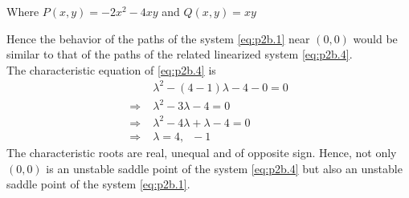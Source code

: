 \documentclass[../main-sheet.tex]{subfiles}
\begin{document}
\begin{soln}[b]
\begin{enumerate}[label=(\roman*)]
        Where \(P(x,y)=-2x^2-4xy\) and \(Q(x,y)=xy\)
    \end{enumerate}
    Hence the behavior of the paths of the system \eqref{eq:p2b.1} near \((0,0)\) would be similar to that of the paths of the related linearized system \eqref{eq:p2b.4}.\\
    The characteristic equation of \eqref{eq:p2b.4} is
    \begin{align*}
        &\lambda^2-(4-1)\lambda-4-0=0\\
        \Rightarrow\;&\lambda^2-3\lambda-4=0\\
        \Rightarrow\;&\lambda^2-4\lambda+\lambda-4=0\\
        \Rightarrow\;&\lambda=4,\;\;-1
    \end{align*}
    The characteristic roots are real, unequal and of opposite sign. Hence, not only \((0,0)\) is an unstable saddle point of the system \eqref{eq:p2b.4} but also an unstable saddle point of the system \eqref{eq:p2b.1}.\\
    

\end{soln}
\end{document}
